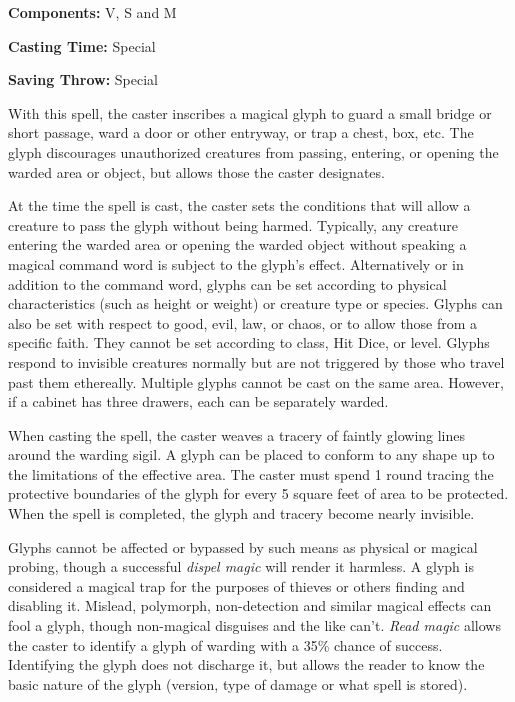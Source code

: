 \begin{multicols}{2}
\begin{minipage}{\columnwidth}
\noindent \textbf{Components:} V, S and M

\noindent \textbf{Casting Time:} Special

\noindent \textbf{Saving Throw:} Special

\end{minipage}

With this spell, the caster inscribes a magical glyph to guard a small bridge or short passage, ward a door or other entryway, or trap a chest, box, etc.  The glyph discourages unauthorized creatures from passing, entering, or opening the warded area or object, but allows those the caster designates.  

At the time the spell is cast, the caster sets the conditions that will allow a creature to pass the glyph without being harmed.  Typically, any creature entering the warded area or opening the warded object without speaking a magical command word is subject to the glyph's effect.  Alternatively or in addition to the command word, glyphs can be set according to physical characteristics (such as height or weight) or creature type or species.  Glyphs can also be set with respect to good, evil, law, or chaos, or to allow those from a specific faith.  They cannot be set according to class, Hit Dice, or level.  Glyphs respond to invisible creatures normally but are not triggered by those who travel past them ethereally.  Multiple glyphs cannot be cast on the same area.  However, if a cabinet has three drawers, each can be separately warded. 

When casting the spell, the caster weaves a tracery of faintly glowing lines around the warding sigil.  A glyph can be placed to conform to any shape up to the limitations of the effective area.  The caster must spend 1 round tracing the protective boundaries of the glyph for every 5 square feet of area to be protected.  When the spell is completed, the glyph and tracery become nearly invisible. 

Glyphs cannot be affected or bypassed by such means as physical or magical probing, though a successful \textit{dispel magic} will render it harmless.  A glyph is considered a magical trap for the purposes of thieves or others finding and disabling it.  Mislead, polymorph, non-detection and similar magical effects can fool a glyph, though non-magical disguises and the like can't.  \textit{Read magic} allows the caster to identify a glyph of warding with a 35\% chance of success.  Identifying the glyph does not discharge it, but allows the reader to know the basic nature of the glyph (version, type of damage or what spell is stored).


\end{multicols}
